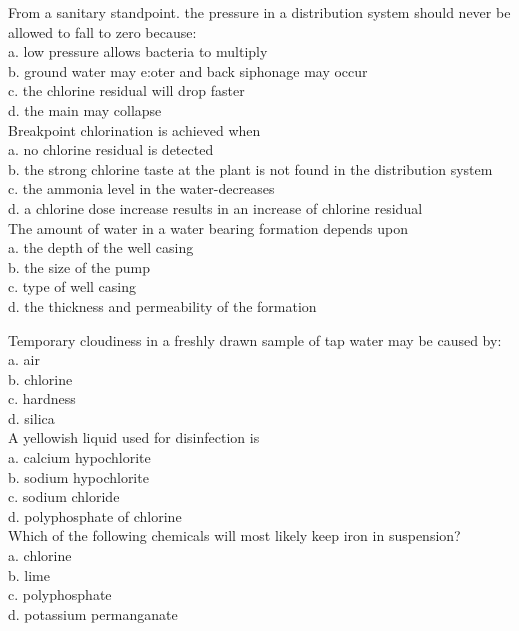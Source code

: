 From a sanitary standpoint. the pressure in a distribution system should never be allowed to fall to zero because:\\
a. low pressure allows bacteria to multiply\\
b. ground water may e:oter and back siphonage may occur\\
c. the chlorine residual will drop faster\\
d. the main may collapse\\

Breakpoint chlorination is achieved when\\
a. no chlorine residual is detected\\
b. the strong chlorine taste at the plant is not found in the distribution system\\
c. the ammonia level in the water-decreases\\
d. a chlorine dose increase results in an increase of chlorine residual\\

The amount of water in a water bearing formation depends upon\\
a. the depth of the well casing\\
b. the size of the pump\\
c. type of well casing\\
d. the thickness and permeability of the formation 

Temporary cloudiness in a freshly drawn sample of tap water may be caused by:\\
a. air\\
b. chlorine\\
c. hardness\\
d. silica\\

A yellowish liquid used for disinfection is\\
a. calcium hypochlorite\\
b. sodium hypochlorite\\
c. sodium chloride\\
d. polyphosphate of chlorine\\

Which of the following chemicals will most likely keep iron in suspension?\\
a. chlorine\\
b. lime\\
c. polyphosphate\\
d. potassium permanganate\\

